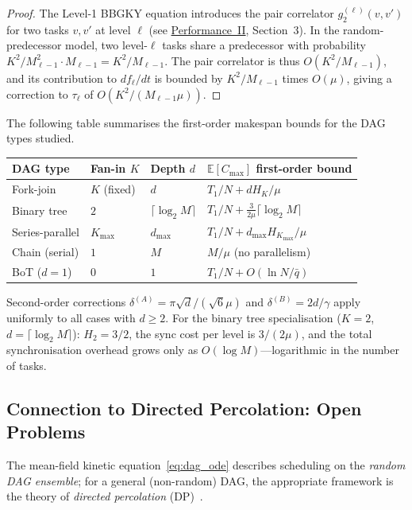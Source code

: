 \documentclass[11pt,a4paper]{article}
\begin{document}
\begin{proof}
The Level-1 BBGKY equation introduces the pair correlator
$g_2^{(\ell)}(v,v')$ for two tasks $v, v'$ at level $\ell$
(see \hyperref[chap:kinetic_theory]{Performance~II}, Section~3).
In the random-predecessor model, two level-$\ell$ tasks share a predecessor
with probability $K^2/M_{\ell-1}^2 \cdot M_{\ell-1} = K^2/M_{\ell-1}$.
The pair correlator is thus $O(K^2/M_{\ell-1})$, and its contribution
to $df_\ell/dt$ is bounded by $K^2/M_{\ell-1}$ times $O(\mu)$,
giving a correction to $\tau_\ell$ of $O(K^2/(M_{\ell-1}\mu))$.
\end{proof}

The following table summarises the first-order makespan bounds for
the DAG types studied.

\begin{center}
\small
\begin{tabular}{@{}llll@{}}
\toprule
DAG type & Fan-in $K$ & Depth $d$ & $\mathbb{E}[C_{\max}]$ first-order bound \\
\midrule
Fork-join & $K$ (fixed) & $d$ & $T_1/N + d H_K/\mu$ \\
Binary tree & $2$ & $\lceil\log_2 M\rceil$ & $T_1/N + \tfrac{3}{2\mu}\lceil\log_2 M\rceil$ \\
Series-parallel & $K_{\max}$ & $d_{\max}$ & $T_1/N + d_{\max} H_{K_{\max}}/\mu$ \\
Chain (serial) & $1$ & $M$ & $M/\mu$ \quad (no parallelism) \\
BoT ($d=1$) & $0$ & $1$ & $T_1/N + O(\ln N/\bar{q})$ \\
\bottomrule
\end{tabular}
\end{center}

\noindent
Second-order corrections $\delta^{(A)} = \pi\sqrt{d}/(\sqrt{6}\mu)$ and
$\delta^{(B)} = 2d/\gamma$ apply uniformly to all cases with $d \geq 2$.
For the binary tree specialisation ($K=2$, $d = \lceil\log_2 M\rceil$):
$H_2 = 3/2$, the sync cost per level is $3/(2\mu)$, and the total
synchronisation overhead grows only as $O(\log M)$---logarithmic in the
number of tasks.

\subsection{Connection to Directed Percolation: Open Problems}

The mean-field kinetic equation~\eqref{eq:dag_ode} describes scheduling
on the \emph{random DAG ensemble}; for a general (non-random) DAG,
the appropriate framework is the theory of
\emph{directed percolation} (DP)~\cite{hinrichsen2000}.
\end{document}
